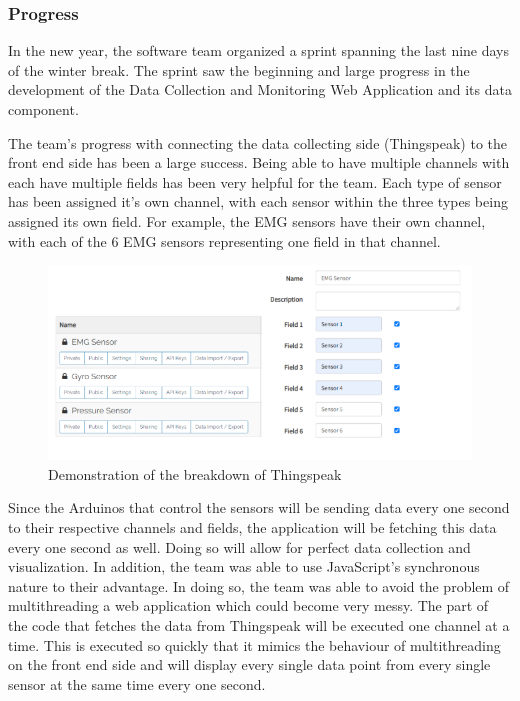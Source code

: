 \subsubsection{Progress}
In the new year, the software team organized a sprint spanning the last nine days of the winter break. The sprint saw the beginning and large progress in the development of the Data Collection and Monitoring Web Application and its data component. 

The team's progress with connecting the data collecting side (Thingspeak) to the front end side has been a large success. Being able to have multiple channels with each have multiple fields has been very helpful for the team. Each type of sensor has been assigned it's own channel, with each sensor within the three types being assigned its own field. For example, the EMG sensors have their own channel, with each of the 6 EMG sensors representing one field in that channel. 
\begin{figure}[htbp]
\centering
\includegraphics[scale=0.9]{Progress_Report/figs/Thingspeak.png}
\caption{Demonstration of the breakdown of Thingspeak}
\label{fig:ThingSpeak}
\end{figure}

Since the Arduinos that control the sensors will be sending data every one second to their respective channels and fields, the application will be fetching this data every one second as well. Doing so will allow for perfect data collection and visualization. In addition, the team was able to use JavaScript's synchronous nature to their advantage. In doing so, the team was able to avoid the problem of multithreading a web application which could become very messy. The part of the code that fetches the data from Thingspeak will be executed one channel at a time. This is executed so quickly that it mimics the behaviour of multithreading on the front end side and will display every single data point from every single sensor at the same time every one second. 

